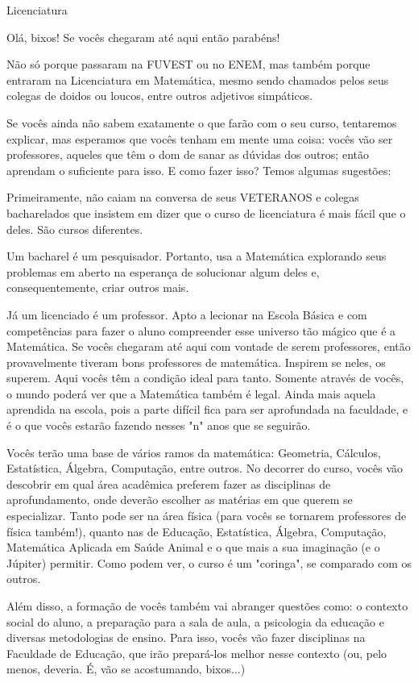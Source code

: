 \begin{subsecao}{Licenciatura}

Olá, bixos! Se vocês chegaram até aqui então parabéns!

Não só porque passaram na FUVEST ou no ENEM, mas também porque entraram na
Licenciatura em Matemática, mesmo sendo chamados pelos seus colegas de doidos ou
loucos, entre outros adjetivos simpáticos.

Se vocês ainda não sabem exatamente o que farão com o seu curso, tentaremos
explicar, mas esperamos que vocês tenham em mente uma coisa: vocês vão ser
professores, aqueles que têm o dom de sanar as dúvidas dos outros; então
aprendam o suficiente para isso. E como fazer isso? Temos algumas sugestões:

Primeiramente, não caiam na conversa de seus VETERANOS e colegas bacharelados
que insistem em dizer que o curso de licenciatura é mais fácil que o deles. São
cursos diferentes.

Um bacharel é um pesquisador. Portanto, usa a Matemática explorando seus
problemas em aberto na esperança de solucionar algum deles e, consequentemente,
criar outros mais.

Já um licenciado é um professor. Apto a lecionar na Escola Básica e com
competências para fazer o aluno compreender esse universo tão mágico que é a
Matemática. Se vocês chegaram até aqui com vontade de serem professores, então
provavelmente tiveram bons professores de matemática. Inspirem se neles, os
superem. Aqui vocês têm a condição ideal para tanto. Somente através de vocês, o
mundo poderá ver que a Matemática também é legal. Ainda mais aquela aprendida na
escola, pois a parte difícil fica para ser aprofundada na faculdade, e é o que
vocês estarão fazendo nesses "n" anos que se seguirão.

Vocês terão uma base de vários ramos da matemática: Geometria, Cálculos,
Estatística, Álgebra, Computação, entre outros. No decorrer do curso, vocês vão
descobrir em qual área acadêmica preferem fazer as disciplinas de
aprofundamento, onde deverão escolher as matérias em que querem se especializar.
Tanto pode ser na área física (para vocês se tornarem professores de física
também!), quanto nas de Educação, Estatística, Álgebra, Computação, Matemática
Aplicada em Saúde Animal e o que mais a sua imaginação (e o Júpiter) permitir.
Como podem ver, o curso é um "coringa", se comparado com os outros.

Além disso, a formação de vocês também vai abranger questões como: o contexto
social do aluno, a preparação para a sala de aula, a psicologia da educação e
diversas metodologias de ensino. Para isso, vocês vão fazer disciplinas na
Faculdade de Educação, que irão prepará-los melhor nesse contexto (ou, pelo
menos, deveria. É, vão se acostumando, bixos...)


\end{subsecao}
